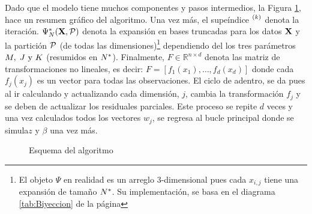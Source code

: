 \documentclass[../Main/Main.tex]{subfiles}
\begin{document}
Dado que el modelo tiene muchos componentes y pasos intermedios, la Figura \ref{fig:DiagramaAlgoritmo}, hace un resumen gráfico del algoritmo. Una vez más, el supeíndice $\iter{k}$ denota la iteración. $\Psi_\N(\xmat, \P)$ denota la expansión en bases truncadas para los datos $\xmat$ y la partición $\P$ (de todas las dimensiones)\footnote{El objeto $\Psi$ en realidad es un arreglo 3-dimensional pues cada $x_{i,j}$ tiene una expansión de tamaño $\N$. Su implementación, se basa en el diagrama \ref{tab:Biyeccion} de la página \pageref{tab:Biyeccion}} dependiendo del los tres parámetros $\MJK$ (resumidos en $\N$). Finalmente, $F\in\mathbb{R}^{n\times d}$ denota las matriz de transformaciones no lineales, es decir: $F = [f_1(x_1),\ldots,f_d(x_d)]$ donde cada $f_j(x_j)$ es un vector para todas las observaciones. El ciclo de adentro, se da pues al ir calculando y actualizando cada dimensión, $j$, cambia la transformación $f_j$ y se deben de actualizar los residuales parciales. Este proceso se repite $d$ veces y una vez calculados todos los vectores $w_j$, se regresa al bucle principal donde se simula$z$ y $\beta$ una vez más. 

\begin{figure}[h]
\centering
{}
\caption{Esquema del algoritmo}
\label{fig:DiagramaAlgoritmo}
\end{figure}
\end{document}
